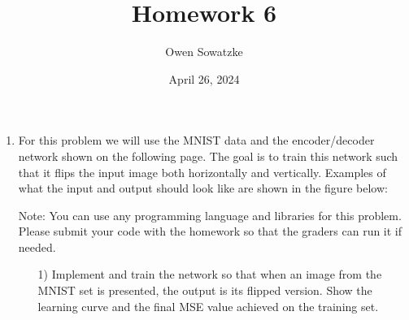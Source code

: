 \documentclass[fleqn]{article}
\title{Homework 6}
\author{Owen Sowatzke}
\date{April 26, 2024}
\newcommand{\zerodisplayskip}{
	\setlength{\abovedisplayskip}{0pt}%
	\setlength{\belowdisplayskip}{0pt}%
	\setlength{\abovedisplayshortskip}{0pt}%
	\setlength{\belowdisplayshortskip}{0pt}%
	\setlength{\mathindent}{0pt}}
\begin{document}
	\offinterlineskip
	\setlength{\lineskip}{12pt}
	\zerodisplayskip
	\maketitle
	
	\begin{enumerate}
		\item For this problem we will use the MNIST data and the encoder/decoder network shown on the following page. The goal is to train this network such that it flips the input image both horizontally and vertically. Examples of what the input and output should look like are shown in the figure below:
		
		\begin{figure}[H]
			\centerline{}
			\label{example_outputs}
		\end{figure}
		
		Note: You can use any programming language and libraries for this problem. Please submit your code with the homework so that the graders can run it if needed.

		\begin{enumerate}
			\item[1)] Implement and train the network so that when an image from the MNIST set is presented, the output is its flipped version. Show the learning curve and the final MSE value achieved on the training set.
			

\end{enumerate}
\end{enumerate}
\end{document}
